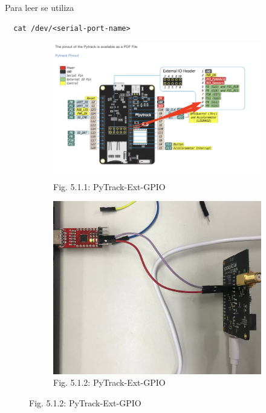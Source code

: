 \documentclass[12pt]{article}
\begin{document}
Para leer se utiliza
\begin{lstlisting}
  cat /dev/<serial-port-name>
\end{lstlisting}

\begin{figure}[ht]
  \centering
  \begin{subfigure}[b]{0.45\linewidth}
    \includegraphics[width=\linewidth]{images/pytrack-external-gpio.png}
    \caption{Fig. 5.1.1: PyTrack-Ext-GPIO}
  \end{subfigure}
  \begin{subfigure}[b]{0.45\linewidth}
    \includegraphics[width=\linewidth]{images/pytrack-external-gpio-2.png}
    \caption{Fig. 5.1.2: PyTrack-Ext-GPIO}
  \end{subfigure}
\end{figure}
\end{document}

